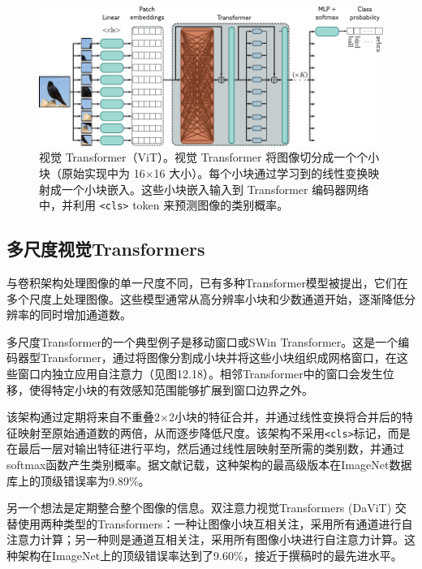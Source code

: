 \documentclass[lang=cn,newtx,10pt,scheme=chinese]{elegantbook}
\begin{document}
\begin{figure}[ht!]
\centering
\includegraphics[width=0.7\linewidth]{PDFFigures/UDLChap12PDF/TransformerVisionTransformer.pdf}
\caption{视觉 Transformer（ViT）。视觉 Transformer 将图像切分成一个个小块（原始实现中为 16×16 大小）。每个小块通过学习到的线性变换映射成一个小块嵌入。这些小块嵌入输入到 Transformer 编码器网络中，并利用 \texttt{\textless cls\textgreater} token 来预测图像的类别概率。}
\end{figure}


\subsection{多尺度视觉Transformers}
与卷积架构处理图像的单一尺度不同，已有多种Transformer模型被提出，它们在多个尺度上处理图像。这些模型通常从高分辨率小块和少数通道开始，逐渐降低分辨率的同时增加通道数。

多尺度Transformer的一个典型例子是移动窗口或SWin Transformer。这是一个编码器型Transformer，通过将图像分割成小块并将这些小块组织成网格窗口，在这些窗口内独立应用自注意力（见图12.18）。相邻Transformer中的窗口会发生位移，使得特定小块的有效感知范围能够扩展到窗口边界之外。

该架构通过定期将来自不重叠2×2小块的特征合并，并通过线性变换将合并后的特征映射至原始通道数的两倍，从而逐步降低尺度。该架构不采用\texttt{\textless cls\textgreater}标记，而是在最后一层对输出特征进行平均，然后通过线性层映射至所需的类别数，并通过softmax函数产生类别概率。据文献记载，这种架构的最高级版本在ImageNet数据库上的顶级错误率为9.89\%。

另一个想法是定期整合整个图像的信息。双注意力视觉Transformers (DaViT) 交替使用两种类型的Transformers：一种让图像小块互相关注，采用所有通道进行自注意力计算；另一种则是通道互相关注，采用所有图像小块进行自注意力计算。这种架构在ImageNet上的顶级错误率达到了9.60\%，接近于撰稿时的最先进水平。
\end{document}

